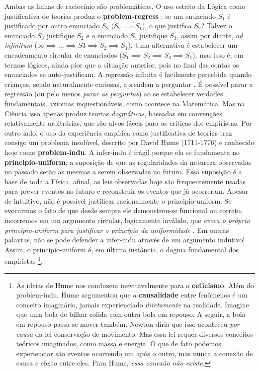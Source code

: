 \documentclass[./main.tex]{subfiles}
\begin{document}
\par Ambas as linhas de raciocínio são problemáticas. O uso estrito da Lógica como justificativa de teorias produz o \textbf{\gls{problem-regress}} \cite{cling2008}: se um enunciado $S_1$ é justificado por outro enunciado $S_2$ ($S_2 \implies S_1$), o que justifica $S_2$? Talvez o enunciado $S_3$ justifique $S_2$ e o enunciado $S_4$ justifique $S_3$, assim por diante, \textit{ad infinitum} ($\infty \implies ... \implies S3 \implies S_2 \implies S_1$). Uma alternativa é estabelecer um encadeamento circular de enunciados  ($S_1 \implies S_2 \implies S_3 \implies S_1$), mas isso é, em termos lógicos, ainda pior que a situação anterior, pois no final das contas os enunciados se auto-justificam. A regressão infinita é facilmente percebida quando crianças, sendo naturalmente curiosas, aprendem a perguntar . É possível parar a regressão (ou pelo menos \textit{parar as perguntas}) ao se estabelecer verdades fundamentais, axiomas inquestionáveis, como acontece na Matemática. Mas na Ciência isso apenas produz teorias \textit{dogmáticas}, baseadas em convenções relativamente arbitrárias, que são alvos fáceis para as críticas dos empiristas. Por outro lado, o uso da experiência empírica como justificativa de teorias traz consigo um problema insolúvel, descrito por David Hume (1711-1776) e conhecido hoje como \textbf{\gls{problem-indu}}. A \gls{infer-indu} é frágil porque ela se fundamenta no \textbf{\gls{principio-uniform}}: a suposição de que as regularidades da natureza observadas no passado serão as mesmas a serem observadas no futuro. Essa suposição é a base de toda a Física, afinal, as leis observadas hoje são frequentemente usadas para prever eventos no futuro e reconstruir os eventos que já ocorreram. Apesar de intuitivo, não é possível justificar racionalmente o \gls{principio-uniform}. Se evocarmos o fato de que desde sempre ele demonstrou-se funcional ou correto, incorremos em um argumento circular, logicamente inválido, que \textit{evoca o próprio \gls{principio-uniform} para justificar o princípio da uniformidade} \cite{sep-induction-problem}. Em outras palavras, não se pode defender a \gls{infer-indu} através de um argumento indutivo! Assim, o \gls{principio-uniform} é, em última instância, o dogma fundamental dos empiristas \footnote{As ideias de Hume nos conduzem inevitavelmente para o \textbf{ceticismo}. Além do \gls{problem-indu}, Hume argumentou que a \textbf{causalidade} entre fenômenos é um conceito imaginário, jamais experienciado \textit{diretamente} na realidade. Imagine que uma bola de bilhar colida com outra bola em repouso. A seguir, a bola em repouso passa se mover também. Newton diria que isso aconteceu \textit{por causa} da lei conservação de movimento. Mas essa lei requer diversos conceitos teóricos imaginados, como massa e energia. O que de fato podemos experienciar são eventos ocorrendo um após o outro, mas nunca a conexão de causa e efeito entre eles. Para Hume, \textit{essa conexão não existe}. }.    
\end{document}
